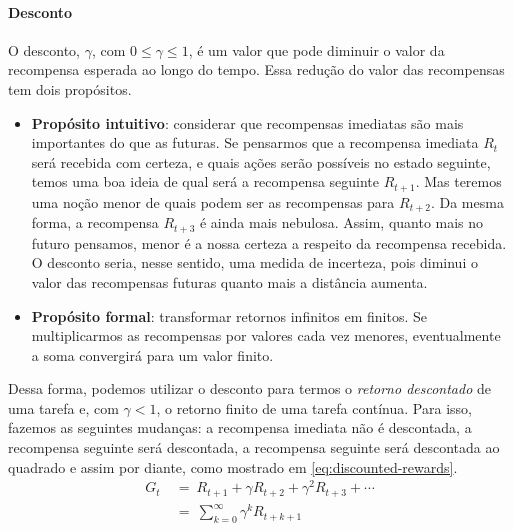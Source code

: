 \documentclass{article}
\begin{document}
                \paragraph{Desconto} \hspace{0pt}

                    O desconto, $\gamma$, com $0 \leq \gamma \leq 1$, é um valor que pode diminuir o valor da recompensa esperada ao longo do tempo. Essa redução do valor das recompensas tem dois propósitos.

                    \begin{itemize}
                        \item \textbf{Propósito intuitivo}: considerar que recompensas imediatas são mais importantes do que as futuras. Se pensarmos que a recompensa imediata $R_t$ será recebida com certeza, e quais ações serão possíveis no estado seguinte, temos uma boa ideia de qual será a recompensa seguinte $R_{t+1}$. Mas teremos uma noção menor de quais podem ser as recompensas para $R_{t+2}$. Da mesma forma, a recompensa $R_{t+3}$ é ainda mais nebulosa. Assim, quanto mais no futuro pensamos, menor é a nossa certeza a respeito da recompensa recebida. O desconto seria, nesse sentido, uma medida de incerteza, pois diminui o valor das recompensas futuras quanto mais a distância aumenta.
                        \item \textbf{Propósito formal}: transformar retornos infinitos em finitos. Se multiplicarmos as recompensas por valores cada vez menores, eventualmente a soma convergirá para um valor finito.
                    \end{itemize}

                    Dessa forma, podemos utilizar o desconto para termos o \emph{retorno descontado} de uma tarefa e, com $\gamma < 1$, o retorno finito de uma tarefa contínua. Para isso, fazemos as seguintes mudanças: a recompensa imediata não é descontada, a recompensa seguinte será descontada, a recompensa seguinte será descontada ao quadrado e assim por diante, como mostrado em \eqref{eq:discounted-rewards}.
                    \begin{equation}
                    \label{eq:discounted-rewards}
                    \begin{split}                    
                        G_t & \ = \ R_{t+1} + \gamma R_{t+2} + \gamma^2 R_{t+3} + \cdots \\
                        & \ = \ \sum_{k=0}^{\infty} \gamma^k R_{t + k + 1}\
                    \end{split}
                \end{equation}
\end{document}
